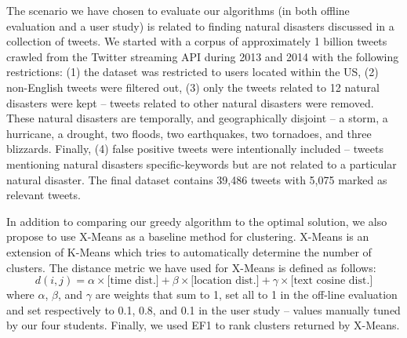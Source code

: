 

The scenario we have chosen to evaluate our algorithms (in both offline evaluation and a user study) is related to finding natural disasters discussed in a collection of tweets.  We started with a corpus of approximately 1 billion tweets crawled from the Twitter streaming API during 2013 and 2014 with the following restrictions:
(1) the dataset was restricted to users located within the US, (2) non-English tweets were filtered out, (3) only the tweets related to 12 natural disasters were kept -- tweets related to other natural disasters were removed. These natural disasters are temporally, and geographically disjoint -- a storm, a hurricane,  a drought, two floods, two earthquakes, two tornadoes,  and three blizzards. Finally, (4) false positive tweets were intentionally included -- tweets mentioning natural disasters specific-keywords but are not related to a particular natural disaster. The final dataset contains 39,486 tweets with 5,075 marked as relevant tweets.


In addition to comparing our greedy algorithm to the optimal solution, we also propose to use X-Means \cite{Pelleg2000} as a baseline method for clustering. X-Means is an extension of K-Means which tries to  automatically determine the number of clusters. %
The distance metric we have used for X-Means is defined as follows:
\begin{equation}
d(i,j) = \alpha\times\textrm{[time dist.]}+\beta\times \textrm{[location dist.]}+\gamma\times \textrm{[text cosine dist.]}
\end{equation}
\noindent where $\alpha$, $\beta$, and $\gamma$ are weights that sum to 1, set all to 1 in the off-line evaluation and set respectively to 0.1, 0.8,  and 0.1 in the user study -- values manually tuned by our four students. Finally, we used EF1 to rank clusters returned by X-Means. 

